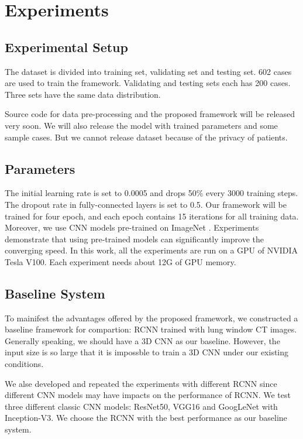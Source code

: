 \documentclass[journal]{IEEEtran}
\begin{document}
\section{Experiments}
\label{experiments}

\subsection{Experimental Setup}
The dataset is divided into training set, validating set and testing set. 602 cases are used to train the framework. Validating and testing sets each has 200 cases. Three sets have the same data distribution.

Source code for data pre-processing and the proposed framework will be released very soon. We will also release the model with trained parameters and some sample cases. But we cannot release dataset because of the privacy of patients. 

\subsection{Parameters}
The initial learning rate is set to 0.0005 and drops 50\% every 3000 training steps. The dropout rate in fully-connected layers is set to 0.5. Our framework will be trained for four epoch, and each epoch contains 15 iterations for all training data. Moreover, we use CNN models pre-trained on ImageNet \cite{ILSVRC15}. Experiments demonstrate that using pre-trained models can significantly improve the converging speed. In this work, all the experiments are run on a GPU of NVIDIA Tesla V100. Each experiment needs about 12G of GPU memory.


\subsection{Baseline System}
To mainifest the advantages offered by the proposed framework, we constructed a baseline framework for compartion: RCNN trained with lung window CT images. 
Generally speaking, we should have a 3D CNN as our baseline. However, the input size is so large that it is impossble to train a 3D CNN under our existing conditions.

We alse developed and repeated the experiments with different RCNN since different CNN models may have impacts on the performance of RCNN. We test three different classic CNN models: ResNet50, VGG16 and GoogLeNet with Inception-V3. We choose the RCNN with the best performance as our baseline system.
\end{document}
